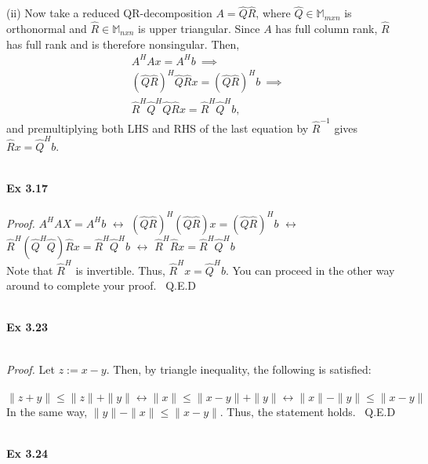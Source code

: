 \documentclass[letterpaper,12pt]{article}
\theoremstyle{definition}
\begin{document}
\begin{spacing}{1.3}{}
	(ii)
	Now take a reduced QR-decomposition $A=\hat{Q}\hat{R}$,
	where $\hat{Q}\in\mathbb M_{mxn}$ is orthonormal and $\hat{R}\in\mathbb M_{nxn}$ is upper triangular.
	Since $A$ has full column rank, $\hat{R}$ has full rank and is therefore nonsingular.
	Then,
	\begin{align*}
	&A^HAx=A^Hb\ \implies\\
	&(\hat{Q}\hat{R})^H\hat{Q}\hat{R}x = (\hat{Q}\hat{R})^Hb\ \implies\\
	&\hat{R}^H\hat{Q}^H\hat{Q}\hat{R}x = \hat{R}^H\hat{Q}^Hb,
	\end{align*}
	and premultiplying both LHS and RHS of the last equation by $\hat{R}^{-1}$ gives
	$\hat{R}x = \hat{Q}^Hb$. \\\\
	
	\setlength{\leftskip}{10pt}
	
	\textbf{Ex 3.17} \\\\
	
	\setlength{\leftskip}{10pt}
	\emph{Proof.} $A^{H}AX = A^{H}b$ $\leftrightarrow$ $(\hat{Q} \hat{R})^{H} (\hat{Q} \hat{R}) x = (\hat{Q} \hat{R})^{H} b $ $\leftrightarrow$ $\hat{R}^{H} (\hat{Q}^{H} \hat{Q}) \hat{R} x = \hat{R}^{H} \hat{Q}^{H} b$ $\leftrightarrow$ $\hat{R}^{H} \hat{R} x = \hat{R}^{H} \hat{Q}^{H}b $ \\
	Note that $\hat{R}^{H}$ is invertible. Thus, $\hat{R}^{H} x = \hat{Q}^{H} b$. You can proceed in the other way around to complete your proof. \ Q.E.D \\\\
	
	\setlength{\leftskip}{10pt}
	
	\textbf{Ex 3.23} \\\\
	
	\setlength{\leftskip}{20pt}
	
	\emph{Proof.} Let $z := x-y$. Then, by triangle inequality, the following is satisfied: \\\\
	\[\|z+y\| \leq \|z\| + \|y\| \leftrightarrow \|x\| \leq \|x-y\| + \|y\| \leftrightarrow \|x\| - \|y\| \leq \|x-y\| \]
	In the same way, $\|y\| - \|x\| \leq \|x-y\|$. Thus, the statement holds. \ Q.E.D \\\\
	
	\setlength{\leftskip}{10pt}
	
	\textbf{Ex 3.24} \\\\
	

\end{spacing}
\end{document}
